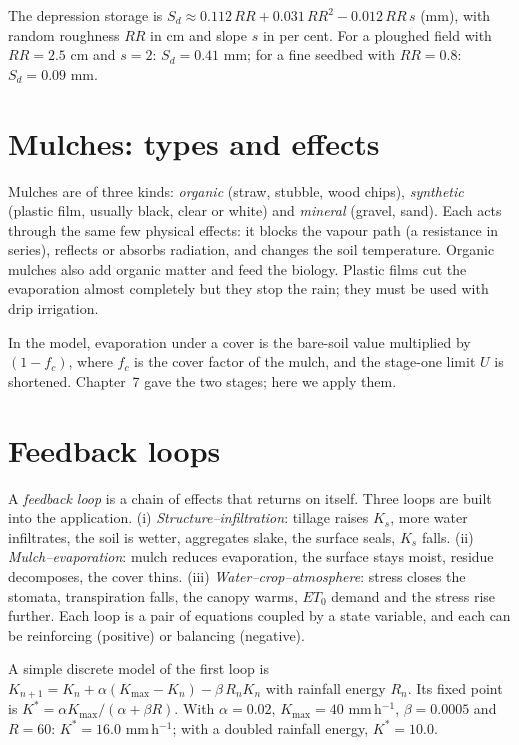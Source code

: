 The depression storage is $S_d\approx0.112\,RR+0.031\,RR^2-0.012\,RR\,s$ (mm), with random roughness $RR$ in cm and slope $s$ in per cent. For a ploughed field with $RR=2.5$ cm and $s=2$: $S_d=0.41$ mm; for a fine seedbed with $RR=0.8$: $S_d=0.09$ mm.

\section{Mulches: types and effects}
Mulches are of three kinds: \emph{organic} (straw, stubble, wood chips), \emph{synthetic} (plastic film, usually black, clear or white) and \emph{mineral} (gravel, sand). Each acts through the same few physical effects: it blocks the vapour path (a resistance in series), reflects or absorbs radiation, and changes the soil temperature. Organic mulches also add organic matter and feed the biology. Plastic films cut the evaporation almost completely but they stop the rain; they must be used with drip irrigation.

In the model, evaporation under a cover is the bare-soil value multiplied by $(1-f_c)$, where $f_c$ is the cover factor of the mulch, and the stage-one limit $U$ is shortened. Chapter~7 gave the two stages; here we apply them.

\section{Feedback loops}
A \emph{feedback loop} is a chain of effects that returns on itself. Three loops are built into the application. (i) \emph{Structure--infiltration}: tillage raises $K_s$, more water infiltrates, the soil is wetter, aggregates slake, the surface seals, $K_s$ falls. (ii) \emph{Mulch--evaporation}: mulch reduces evaporation, the surface stays moist, residue decomposes, the cover thins. (iii) \emph{Water--crop--atmosphere}: stress closes the stomata, transpiration falls, the canopy warms, $ET_0$ demand and the stress rise further. Each loop is a pair of equations coupled by a state variable, and each can be reinforcing (positive) or balancing (negative).

A simple discrete model of the first loop is $K_{n+1}=K_n+\alpha(K_{\max}-K_n)-\beta\,R_n K_n$ with rainfall energy $R_n$. Its fixed point is $K^*=\alpha K_{\max}/(\alpha+\beta R)$. With $\alpha=0.02$, $K_{\max}=40$ mm\,h$^{-1}$, $\beta=0.0005$ and $R=60$: $K^*=16.0$ mm\,h$^{-1}$; with a doubled rainfall energy, $K^*=10.0$.

